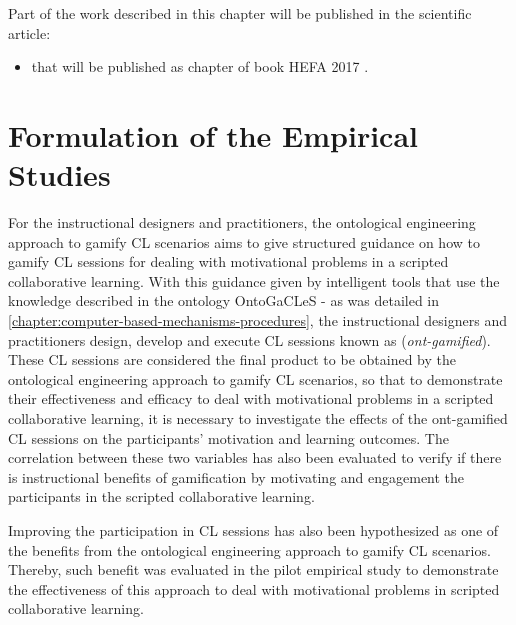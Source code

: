 Part of the work described in this chapter will be published in the scientific article:

\begin{itemize}
\item
{} that will be published as chapter of book  HEFA 2017 \cite{ChallcoMizoguchiIsotani2017}.
\end{itemize}

\section{Formulation of the Empirical Studies}
\label{sec:formulation-empirical-studies}

For the instructional designers and practitioners, the ontological engineering approach to gamify CL scenarios aims to give structured guidance on how to gamify CL sessions for dealing with motivational problems in a scripted collaborative learning.
With this guidance given by intelligent tools that use the knowledge described in the ontology OntoGaCLeS - as was detailed in \autoref{chapter:computer-based-mechanisms-procedures}, the instructional designers and practitioners design, develop and execute CL sessions known as  (\emph{ont-gamified}).
These CL sessions are considered the final product to be obtained by the ontological engineering approach to gamify CL scenarios, so that to demonstrate their effectiveness and efficacy to deal with motivational problems in a scripted collaborative learning, it is necessary to investigate the effects of the ont-gamified CL sessions on the participants' motivation and learning outcomes.
The correlation between these two variables has also been evaluated to verify if there is instructional benefits of gamification by motivating and engagement the participants in the scripted collaborative learning.

Improving the participation in CL sessions has also been hypothesized as one of the benefits from the ontological engineering approach to gamify CL scenarios.
Thereby, such benefit was evaluated in the pilot empirical study to demonstrate the effectiveness of this approach to deal with motivational problems in scripted collaborative learning.

